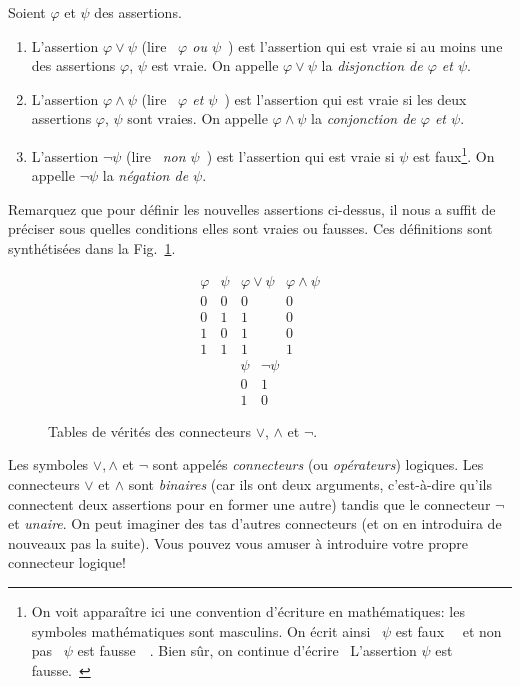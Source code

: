 \documentclass[french,course,oneside,theoremnosection]{lecture}
\begin{document}
\begin{definition}
Soient $\varphi$ et $\psi$ des assertions.
\begin{enumerate}[(1)]
\item L'assertion $\varphi \vee \psi$ (lire  \og~\emph{$\varphi$ ou $\psi$}~\fg{}) est l'assertion qui est vraie si au moins une des assertions $\varphi$, $\psi$ est vraie. On appelle $\varphi \vee \psi$ la   
\emph{disjonction de $\varphi$ et $\psi$}.
\item L'assertion $\varphi \wedge \psi$ (lire  \og~\emph{$\varphi$ et $\psi$}~\fg{}) est l'assertion qui est vraie si les deux assertions $\varphi$, $\psi$ sont vraies. On appelle $\varphi \wedge \psi$ la   
\emph{conjonction de $\varphi$ et $\psi$}.
\item L'assertion $\neg \psi$  (lire  \og~\emph{non $\psi$}~\fg{}) est l'assertion qui est vraie si $\psi$ est faux\footnote{On voit apparaître ici une convention d'écriture en mathématiques: les symboles mathématiques sont masculins. On écrit ainsi \og~$\psi$ est faux~\fg{}~ et non pas \og~$\psi$ est fausse~\fg{}~. Bien sûr, on continue d'écrire \og~L'assertion $\psi$ est fausse.~\fg{}}. On appelle $\neg\psi$ la  \emph{négation de $\psi$}.
\end{enumerate}
\end{definition}
Remarquez que pour définir les nouvelles assertions ci-dessus, il nous a suffit de préciser sous quelles conditions elles sont vraies ou fausses. Ces définitions sont synthétisées dans la Fig.~\ref{fig:veri}.
\begin{figure}
\[
\begin{array}{c|c|c|c}
\varphi & \psi & \varphi \vee \psi & \varphi \wedge \psi\\\hline
0 & 0 & 0 & 0\\
0 & 1 & 1 & 0 \\
1 & 0 & 1 & 0 \\
1 & 1 & 1 & 1
\end{array}
\]
\[
\begin{array}{c|c}
\psi & \neg \psi\\\hline
0 & 1\\
1 & 0
 \end{array}
 \]
 \caption{Tables de vérités des connecteurs $\vee$, $\wedge$ et $\neg$.}\label{fig:veri}
\end{figure}

Les symboles $\vee, \wedge$ et $\neg$ sont appelés \emph{connecteurs} (ou \emph{opérateurs}) logiques. Les connecteurs $\vee$ et $\wedge$ sont \emph{binaires} (car ils ont deux arguments, c'est-à-dire qu'ils connectent deux assertions pour en former une autre) tandis que le connecteur $\neg$ et \emph{unaire}. On peut imaginer des tas d'autres connecteurs (et on en introduira de nouveaux pas la suite). Vous pouvez vous amuser à introduire votre propre connecteur logique!
\end{document}
